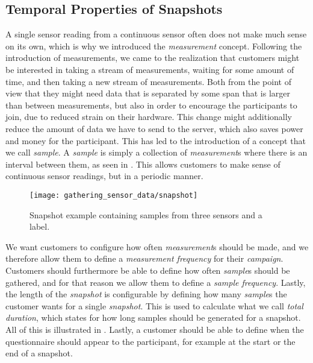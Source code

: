 

\subsection{Temporal Properties of Snapshots}
\label{sec:temporal_properties_of_snapshots}


A single sensor reading from a continuous sensor often does not make much sense on its own, which is why we introduced the \emph{measurement} concept. Following the introduction of measurements, we came to the realization that customers might be interested in taking a stream of measurements, waiting for some amount of time, and then taking a new stream of measurements. Both from the point of view that they might need data that is separated by some span that is larger than between measurements, but also in order to encourage the participants to join, due to reduced strain on their hardware. This change might additionally reduce the amount of data we have to send to the server, which also saves power and money for the participant. This has led to the introduction of a concept that we call \emph{sample}. A \emph{sample} is simply a collection of \emph{measurement}s where there is an interval between them, as seen in . This allows customers to make sense of continuous sensor readings, but in a periodic manner. 

\begin{figure}[!htbp]
    \centering
    \texttt{[image: gathering\_sensor\_data/snapshot]}
    \caption{Snapshot example containing samples from three sensors and a label.}
    \label{fig:snapshot_example_with_samples}
\end{figure}
\FloatBarrier

We want customers to configure how often \emph{measurement}s should be made, and we therefore allow them to define a \emph{measurement frequency} for their \emph{campaign}. Customers should furthermore be able to define how often \emph{sample}s should be gathered, and for that reason we allow them to define a \emph{sample frequency}. Lastly, the length of the \emph{snapshot} is configurable by defining how many \emph{sample}s the customer wants for a single \emph{snapshot}. This is used to calculate what we call \emph{total duration}, which states for how long samples should be generated for a snapshot. All of this is illustrated in . Lastly, a customer should be able to define when the questionnaire should appear to the participant, for example at the start or the end of a snapshot.

